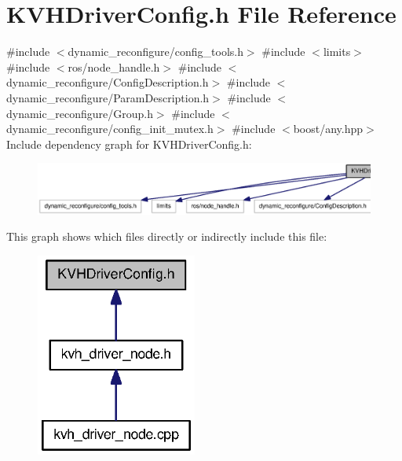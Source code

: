\section{\-K\-V\-H\-Driver\-Config.\-h \-File \-Reference}
\label{KVHDriverConfig_8h}
{\ttfamily \#include $<$dynamic\-\_\-reconfigure/config\-\_\-tools.\-h$>$}\*
{\ttfamily \#include $<$limits$>$}\*
{\ttfamily \#include $<$ros/node\-\_\-handle.\-h$>$}\*
{\ttfamily \#include $<$dynamic\-\_\-reconfigure/\-Config\-Description.\-h$>$}\*
{\ttfamily \#include $<$dynamic\-\_\-reconfigure/\-Param\-Description.\-h$>$}\*
{\ttfamily \#include $<$dynamic\-\_\-reconfigure/\-Group.\-h$>$}\*
{\ttfamily \#include $<$dynamic\-\_\-reconfigure/config\-\_\-init\-\_\-mutex.\-h$>$}\*
{\ttfamily \#include $<$boost/any.\-hpp$>$}\*
\-Include dependency graph for \-K\-V\-H\-Driver\-Config.\-h\-:
\nopagebreak
\begin{figure}[H]
\begin{center}
\leavevmode
\includegraphics[width=350pt]{KVHDriverConfig_8h__incl}
\end{center}
\end{figure}
\-This graph shows which files directly or indirectly include this file\-:
\nopagebreak
\begin{figure}[H]
\begin{center}
\leavevmode
\includegraphics[width=150pt]{KVHDriverConfig_8h__dep__incl}
\end{center}
\end{figure}
